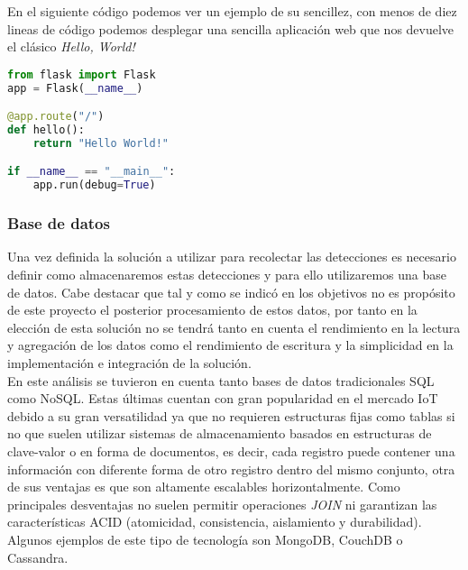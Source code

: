 \documentclass[../proyecto.tex]{subfiles}
\begin{document}
En el siguiente código podemos ver un ejemplo de su sencillez, con menos de diez lineas de código podemos desplegar una sencilla aplicación web que nos devuelve el clásico \textit{Hello, World!}\\

\begin{minipage}{\linewidth}
\begin{lstlisting}[language=Python, caption=Ejemplo de aplicación web básica con Flask, captionpos=b, frame=single]
from flask import Flask
app = Flask(__name__)

@app.route("/")
def hello():
    return "Hello World!"

if __name__ == "__main__":
    app.run(debug=True)
\end{lstlisting}
\end{minipage}

\subsubsection{Base de datos}

 Una vez definida la solución a utilizar para recolectar las detecciones es necesario definir como almacenaremos estas detecciones y para ello utilizaremos una base de datos. Cabe destacar que tal y como se indicó en los objetivos no es propósito de este proyecto el posterior procesamiento de estos datos, por tanto en la elección de esta solución no se tendrá tanto en cuenta el rendimiento en la lectura y agregación de los datos como el rendimiento de escritura y la simplicidad en la implementación e integración de la solución.\\

En este análisis se tuvieron en cuenta tanto bases de datos tradicionales SQL como NoSQL. Estas últimas cuentan con gran popularidad en el mercado IoT debido a su gran versatilidad ya que no requieren estructuras fijas como tablas si no que suelen utilizar sistemas de almacenamiento basados en estructuras de clave-valor o en forma de documentos, es decir, cada registro puede contener una información con diferente forma de otro registro dentro del mismo conjunto, otra de sus ventajas es que son altamente escalables horizontalmente. Como principales desventajas no suelen permitir operaciones \textit{JOIN} ni garantizan las características ACID (atomicidad, consistencia, aislamiento y durabilidad). Algunos ejemplos de este tipo de tecnología son MongoDB, CouchDB o Cassandra.\\
\end{document}

